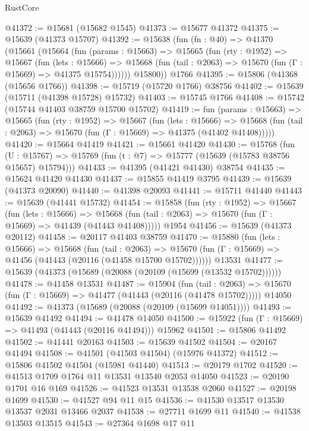\begin{lexlean}{RustCore}
\begin{coremodule}
@41372 := @15681 (@15682 @1545)
@41373 := @15677 @41372
@41375 := @15639 (@41373 @15707)
@41392 := @15638
    (fun (fn : @40) =>
    @41370
      (@15661
        (@15664
          (fun (params : @15663) =>
          @15665
            (fun (rty : @1952) =>
            @15667
              (fun (lets : @15666) =>
              @15668 (fun (tail : @2063) => @15670 (fun (Γ : @15669) => @41375 @15754))))))
        @15800))
    @1766
@41395 := @15806 (@41368 (@15656 @1766))
@41398 := @15719 (@15720 @1766) @38756
@41402 := @15639 (@15711 (@41398 @15728) @15732)
@41403 := @15745 @1766
@41408 := @15742 (@15744 @41403 @38759 @15700 @15702)
@41419 := fun (params : @15663) =>
  @15665
    (fun (rty : @1952) =>
    @15667
      (fun (lets : @15666) =>
      @15668 (fun (tail : @2063) => @15670 (fun (Γ : @15669) => @41375 (@41402 @41408)))))
@41420 := @15664 @41419
@41421 := @15661 @41420
@41430 := @15768
    (fun (U : @15767) => @15769 (fun (t : @7) => @15777 (@15639 (@15783 @38756 @15657) @15794)))
@41433 := @41395 (@41421 @41430) @38754
@41435 := @15624 @41420 @41430
@41437 := @15855 @41419 @3795
@41439 := @15639 (@41373 @20090)
@41440 := @41398 @20093
@41441 := @15711 @41440
@41443 := @15639 (@41441 @15732)
@41454 := @15858
    (fun (rty : @1952) =>
    @15667
      (fun (lets : @15666) =>
      @15668 (fun (tail : @2063) => @15670 (fun (Γ : @15669) => @41439 (@41443 @41408)))))
    @1954
@41456 := @15639 (@41373 @20112)
@41458 := @20117 @41403 @38759
@41470 := @15880
    (fun (lets : @15666) =>
    @15668
      (fun (tail : @2063) =>
      @15670 (fun (Γ : @15669) => @41456 (@41443 (@20116 (@41458 @15700 @15702))))))
    @13531
@41477 := @15639 (@41373 (@15689 (@20088 (@20109 (@15699 (@13532 @15702))))))
@41478 := @41458 @13531
@41487 := @15904
    (fun (tail : @2063) => @15670 (fun (Γ : @15669) => @41477 (@41443 (@20116 (@41478 @15702)))))
    @14050
@41492 := @41373 (@15689 (@20088 (@20109 (@15699 @14051))))
@41493 := @15639 @41492
@41494 := @41478 @14050
@41500 := @15922 (fun (Γ : @15669) => @41493 (@41443 (@20116 @41494))) @15962
@41501 := @15806 @41492
@41502 := @41441 @20163
@41503 := @15639 @41502
@41504 := @20167 @41494
@41508 := @41501 (@41503 @41504) (@15976 @41372)
@41512 := @15806 @41502 @41504 (@15981 @41440)
@41513 := @20179 @1702
@41520 := @41513 @1709 @1764 @11 @13531 @13540 @2053 @14050
@41523 := @20190 @1701 @16 @169
@41526 := @41523 @13531 @13538 @2060
@41527 := @20198 @1699
@41530 := @41527 @94 @11 @15
@41536 := @41530 @13517 @13530 @13537 @2031 @13466 @2037
@41538 := @27711 @1699 @11
@41540 := @41538 @13503 @13515
@41543 := @27364 @1698 @17 @11

\end{coremodule}
\end{lexlean}
